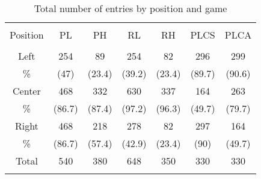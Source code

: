 
\begin{table}[!htbp] \centering 
  \caption{Total number of entries by position and game} 
  \label{tab:rawentry} 
\begin{tabular}{@{\extracolsep{5pt}} ccccccc} 
\\[-1.8ex]\hline 
\hline \\[-1.8ex] 
Position & PL & PH & RL & RH & PLCS & PLCA \\ 
\hline \\[-1.8ex] 
Left & 254 &  89 & 254 &  82 & 296 & 299 \\ 
\% & (47) & (23.4) & (39.2) & (23.4) & (89.7) & (90.6) \\ 
Center & 468 & 332 & 630 & 337 & 164 & 263 \\ 
\% & (86.7) & (87.4) & (97.2) & (96.3) & (49.7) & (79.7) \\ 
Right & 468 & 218 & 278 &  82 & 297 & 164 \\ 
\% & (86.7) & (57.4) & (42.9) & (23.4) & (90) & (49.7) \\ 
Total & 540 & 380 & 648 & 350 & 330 & 330 \\ 
\hline \\[-1.8ex] 
\end{tabular} 
\end{table} 
